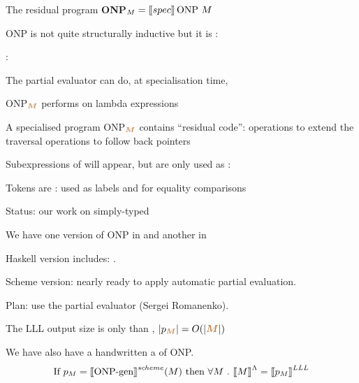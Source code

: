 \documentclass[12pt,fleqn,landscape]{article}
\begin{document}
\begin{slide}{The residual program \textbf{ONP}$_M = \lsem \lowercase{spec}\rsem \, \mbox{ONP}\ M$}

ONP is not quite structurally inductive but it is :\\

\hfill{}

:
\bi
\vair

\ii The partial evaluator can do, at specialisation time,

  \hfill {}
\ii ONP$_{{\color{brown}\textit{\boldmath{$M$}}}}$ performs  on  lambda expressions
\vair

\ii A specialised program ONP$_{{\color{brown}\textit{\boldmath{$M$}}}}$ contains ``residual code'':
  \bi
  \ii operations to extend the traversal
  \ii operations to follow back pointers
  \ei
\vair

\ii Subexpressions of  will appear, but are only used as :

  Tokens are : used as labels and for equality comparisons
\ei

\end{slide}



\begin{slide}{Status: our work on simply-typed \lc }

\be
\item We have one version of ONP  in   and another in 
\item {\sc Haskell} version includes: .
\item {\sc Scheme} version: nearly ready to apply automatic partial evaluation.

  Plan: use the  partial evaluator (Sergei Romanenko).

\item The LLL output size is only 
  than , $|p_{{\color{brown}\textit{\boldmath{$M$}}}}| = O(|{\color{brown}\textit{\boldmath{$M$}}}|)$
\item We have also have a handwritten a  of ONP.
  $$
  \mbox{If\ }p_M = \mbox{$\lbrack\hspace{-0.3ex}\lbrack$} \mbox{ONP-gen} \mbox{$\rbrack\hspace{-0.3ex}\rbrack$}^{\sc scheme} (M)
  \mbox{\ then\ }
  \forall M \ .\ \mbox{$\lbrack\hspace{-0.3ex}\lbrack$} M\mbox{$\rbrack\hspace{-0.3ex}\rbrack$}^\Lambda =  \mbox{$\lbrack\hspace{-0.3ex}\lbrack$} p_M \mbox{$\rbrack\hspace{-0.3ex}\rbrack$}^{LLL} 
  $$

  {\Large {}}
\ee
\end{slide}
\end{document}
